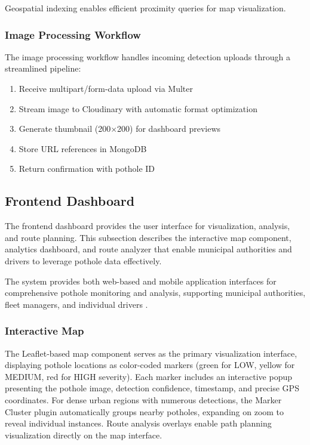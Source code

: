 \documentclass{ieeeaccess}
\begin{document}
Geospatial indexing enables efficient proximity queries for map visualization.

\subsubsection{Image Processing Workflow}
The image processing workflow handles incoming detection uploads through a streamlined pipeline:
\begin{enumerate}
    \item Receive multipart/form-data upload via Multer
    \item Stream image to Cloudinary with automatic format optimization
    \item Generate thumbnail (200$\times$200) for dashboard previews
    \item Store URL references in MongoDB
    \item Return confirmation with pothole ID
\end{enumerate}

\subsection{Frontend Dashboard}

The frontend dashboard provides the user interface for visualization, analysis, and route planning. This subsection describes the interactive map component, analytics dashboard, and route analyzer that enable municipal authorities and drivers to leverage pothole data effectively.

The system provides both web-based and mobile application interfaces for comprehensive pothole monitoring and analysis, supporting municipal authorities, fleet managers, and individual drivers \cite{b17}.

\subsubsection{Interactive Map}
The Leaflet-based map component serves as the primary visualization interface, displaying pothole locations as color-coded markers (green for LOW, yellow for MEDIUM, red for HIGH severity). Each marker includes an interactive popup presenting the pothole image, detection confidence, timestamp, and precise GPS coordinates. For dense urban regions with numerous detections, the Marker Cluster plugin automatically groups nearby potholes, expanding on zoom to reveal individual instances. Route analysis overlays enable path planning visualization directly on the map interface.
\end{document}
